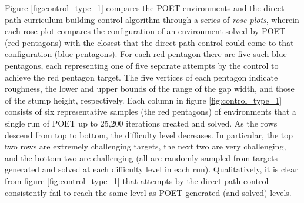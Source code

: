 \documentclass{article}
\newcommand{\jc}[1]{\comments{\textcolor{deepForestGreen}{[JC: #1]}}}
\newcommand{\ks}[1]{\comments{\textcolor{purple}{[Ken: #1]}}}
\newcommand{\rw}[1]{\comments{\textcolor{blue}{[Rui: #1]}}}
\newcommand{\comments}[1]{#1}
\begin{document}
Figure \ref{fig:control_type_1} compares the POET environments and the direct-path curriculum-building control algorithm through a series of \emph{rose plots}, wherein each rose plot compares the configuration of an environment solved by POET (red pentagons) with the closest that the direct-path control could come to that configuration (blue pentagons).  For each red pentagon there are five such blue pentagons, each representing one of five separate attempts by the control to achieve the red pentagon target.
The five vertices of each pentagon indicate roughness, the lower and upper bounds of the range of the gap width, and those of the stump height, respectively.
Each column in figure \ref{fig:control_type_1} consists of six representative samples (the red pentagons) of environments that a single run of POET up to 25,200 iterations 
created and solved.  
As the rows descend from top to bottom, the difficulty level decreases.  In particular, the top two rows are extremely challenging targets, the next two are very challenging, and the bottom two are challenging (all are randomly sampled from targets generated and solved at each difficulty level in each run).  
Qualitatively, it is clear from figure \ref{fig:control_type_1} that attempts by the direct-path control consistently fail to reach the same level as POET-generated (and solved) levels.  
\end{document}
